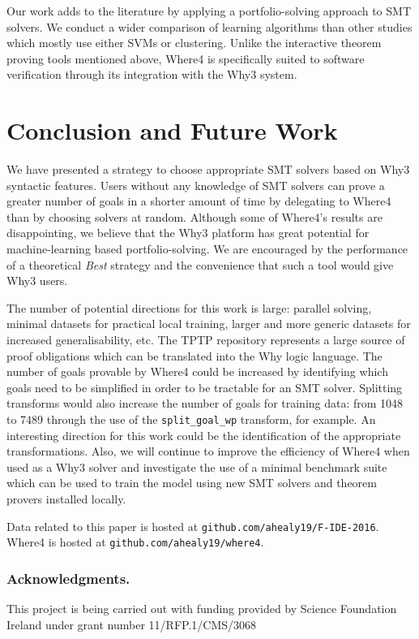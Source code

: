 \documentclass[submission,copyright,creativecommons]{eptcs}
\begin{document}
Our work adds to the literature by applying a portfolio-solving approach to SMT solvers. We conduct a wider comparison of learning algorithms than other studies which mostly use either SVMs or clustering. Unlike the interactive theorem proving tools mentioned above, \textsf{Where4} is specifically suited to software verification through its integration with the \textsf{Why3} system.

\section{Conclusion and Future Work}

We have presented a strategy to choose appropriate SMT solvers based on \textsf{Why3} syntactic features. Users without any knowledge of SMT solvers can prove a greater number of goals in a shorter amount of time by delegating to \textsf{Where4} than by choosing solvers at random. Although some of \textsf{Where4}'s results are disappointing, we believe that the \textsf{Why3} platform has great potential for machine-learning based portfolio-solving. We are encouraged by the performance of a theoretical \textit{Best} strategy and the convenience that such a tool would give \textsf{Why3} users.

The number of potential directions for this work is large: parallel solving, minimal datasets for practical local training, larger and more generic datasets for increased generalisability, etc. 
The TPTP repository represents a large source of proof obligations which can be translated into the Why logic language. The number of goals provable by \textsf{Where4} could be increased by identifying which goals need to be simplified in order to be tractable for an SMT solver. Splitting transforms would also increase the number of goals for training data: from 1048 to 7489 through the use of the \texttt{split\_goal\_wp} transform, for example.  An interesting direction for this work could be the identification of the appropriate transformations. Also, we will continue to improve the efficiency of \textsf{Where4} when used as a \textsf{Why3} solver and investigate the use of a minimal benchmark suite which can be used to train the model using new SMT solvers and theorem provers installed locally.  

Data related to this paper is hosted at \texttt{github.com/ahealy19/F-IDE-2016}. \textsf{Where4} is hosted at \texttt{github.com/ahealy19/where4}. 

\subsubsection*{Acknowledgments.}This project is being carried out with funding provided by Science Foundation Ireland under grant number 11/RFP.1/CMS/3068



\end{document}
